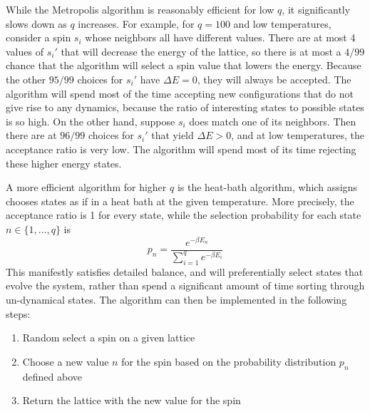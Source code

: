 \documentclass[twocolumn,aps]{revtex4-1} %
\begin{document}
While the Metropolis algorithm is reasonably efficient for low $q$, it significantly slows down as $q$ increases. For example, for $q = 100$ and low temperatures, consider a spin $s_i$ whose neighbors all have different values. There are at most 4 values of $s_i'$ that will decrease the energy of the lattice, so there is at most a $4/99$ chance that the algorithm will select a spin value that lowers the energy. Because the other $95/99$ choices for $s_i'$ have $\Delta E = 0$, they will always be accepted. The algorithm will spend most of the time accepting new configurations that do not give rise to any dynamics, because the ratio of interesting states to possible states is so high. On the other hand, suppose $s_i$ does match one of its neighbors. Then there are at $96/99$ choices for $s_i'$ that yield $\Delta E > 0$, and at low temperatures, the acceptance ratio is very low. The algorithm will spend most of its time rejecting these higher energy states. 

A more efficient algorithm for higher $q$ is the heat-bath algorithm, which assigns chooses states as if in a heat bath at the given temperature. More precisely, the acceptance ratio is 1 for every state, while the selection probability for each state $n \in \{1,\ldots,q\}$ is
\begin{equation}
	p_n = \frac{e^{-\beta E_n}}{\sum_{i=1}^q e^{-\beta E_i}}
\end{equation}
This manifestly satisfies detailed balance, and will preferentially select states that evolve the system, rather than spend a significant amount of time sorting through un-dynamical states. The algorithm can then be implemented in the following steps:
\begin{enumerate}
	\item Random select a spin on a given lattice
	\item Choose a new value $n$ for the spin based on the probability distribution $p_n$ defined above
	\item Return the lattice with the new value for the spin
\end{enumerate}
\end{document}
